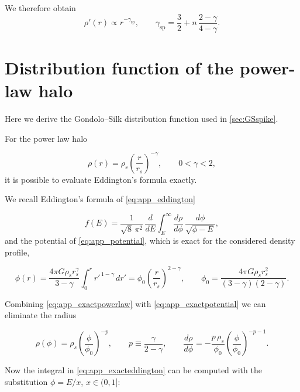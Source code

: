 We therefore obtain
\begin{equation}
\rho'(r) \propto r^{-\gamma_{\mathrm{sp}}},
\qquad
\gamma_{\mathrm{sp}} = \frac{3}{2} + n\,\frac{2-\gamma}{4-\gamma} .
\end{equation}






\section{Distribution function of the power-law halo}
\label{app:fGS}

Here we derive the Gondolo--Silk distribution function used in \cref{sec:GSspike}.

For the power law halo

\begin{equation} \label{eq:app_exactpowerlaw}
   \rho(r) = \rho_s \left( \frac{r}{r_s} \right)^{-\gamma},
    \qquad 0<\gamma<2,
\end{equation}
it is possible to evaluate Eddington's formula exactly.

We recall Eddington's formula of \cref{eq:app_eddington}

\begin{equation} \label{eq:app_exacteddington}
f(E)
= \frac{1}{\sqrt{8}\,\pi^2}\,
\frac{d}{dE} \int_{E}^{\infty} \frac{d\rho}{d\phi}\,
\frac{d\phi}{\sqrt{\phi-E}},
\end{equation}
and the potential of \cref{eq:app_potential}, which is exact for the considered density profile,

\begin{equation} \label{eq:app_exactpotential}
\phi(r) = \frac{4\pi G \rho_s r_s^{\gamma}}{3-\gamma}\int_0^r r'^{\,1-\gamma}\, dr'
= \phi_0 \left( \frac{r}{r_s} \right)^{2-\gamma},
\qquad
\phi_0 = \frac{4\pi G \rho_s r_s^{2}}{(3-\gamma)(2-\gamma)} .
\end{equation}

Combining \cref{eq:app_exactpowerlaw} with \cref{eq:app_exactpotential} we can eliminate the radius

\begin{equation}
\rho(\phi) = \rho_s \left( \frac{\phi}{\phi_0} \right)^{-p},
\qquad
p \equiv \frac{\gamma}{2-\gamma},
\qquad
\frac{d\rho}{d\phi} = -\frac{p\,\rho_s}{\phi_0}
\left( \frac{\phi}{\phi_0} \right)^{-p-1} .
\end{equation}

Now the integral in \cref{eq:app_exacteddington} can be computed with the
substitution $\phi = E/x$, $x \in (0,1]$:

